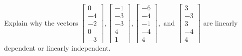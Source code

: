 \documentclass{article}
\begin{document}
\begin{exerciseStatement}
    Explain why the vectors \(\left[\begin{array}{r}
0 \\
-4 \\
-2 \\
0 \\
-3
\end{array}\right] , \left[\begin{array}{r}
-1 \\
-3 \\
-3 \\
4 \\
1
\end{array}\right] , \left[\begin{array}{r}
-6 \\
-4 \\
-1 \\
-4 \\
4
\end{array}\right] , \text{ and } \left[\begin{array}{r}
3 \\
-3 \\
3 \\
-4 \\
4
\end{array}\right]\) are linearly dependent or linearly independent.


  
\end{exerciseStatement}
\end{document}
